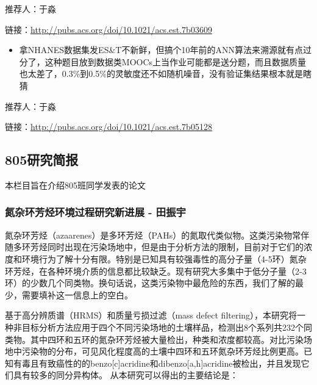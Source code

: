 \documentclass[
]{book}
\providecommand{\tightlist}{%
  \setlength{\itemsep}{0pt}\setlength{\parskip}{0pt}}
\begin{document}
推荐人：于淼

链接：\url{http://pubs.acs.org/doi/10.1021/acs.est.7b03609}

\begin{itemize}
\tightlist
\item
  拿NHANES数据集发ES\&T不新鲜，但搞个10年前的ANN算法来溯源就有点过分了，这种题目放到数据类MOOCs上当作业可能都是送分题，而且数据质量也太差了，0.3\%到0.5\%的灵敏度还不如随机噪音，没有验证集结果根本就是瞎猜
\end{itemize}

推荐人：于淼

链接：\url{http://pubs.acs.org/doi/10.1021/acs.est.7b05128}

\hypertarget{ux7814ux7a76ux7b80ux62a5-1}{%
\subsection*{805研究简报}\label{ux7814ux7a76ux7b80ux62a5-1}}

本栏目旨在介绍805班同学发表的论文

\hypertarget{ux6c2eux6742ux73afux82b3ux70c3ux73afux5883ux8fc7ux7a0bux7814ux7a76ux65b0ux8fdbux5c55---ux7530ux632fux5b87}{%
\subsubsection*{氮杂环芳烃环境过程研究新进展 - 田振宇}\label{ux6c2eux6742ux73afux82b3ux70c3ux73afux5883ux8fc7ux7a0bux7814ux7a76ux65b0ux8fdbux5c55---ux7530ux632fux5b87}}

氮杂环芳烃（azaarenes）是多环芳烃（PAHs）的氮取代类似物。这类污染物常伴随多环芳烃同时出现在污染场地中，但是由于分析方法的限制，目前对于它们的浓度和环境行为了解十分有限。特别是已知具有较强毒性的高分子量（4-5环）氮杂环芳烃，在各种环境介质的信息都比较缺乏。现有研究大多集中于低分子量（2-3环）的少数几个同类物。换句话说，这类污染物中最危险的东西，我们了解的最少，需要填补这一信息上的空白。

基于高分辨质谱（HRMS）和质量亏损过滤（mass defect filtering），本研究将一种非目标分析方法应用于四个不同污染场地的土壤样品，检测出8个系列共232个同类物。其中四环和五环的氮杂环芳烃被大量检出，种类和浓度都较高。对比污染场地中污染物的分布，可见风化程度高的土壤中四环和五环氮杂环芳烃比例更高。已知有毒且有致癌性的的benzo{[}c{]}acridine和dibenzo{[}a,h{]}acridine被检出，并且发现它们具有较多的同分异构体。
从本研究可以得出的主要结论是：
\end{document}
